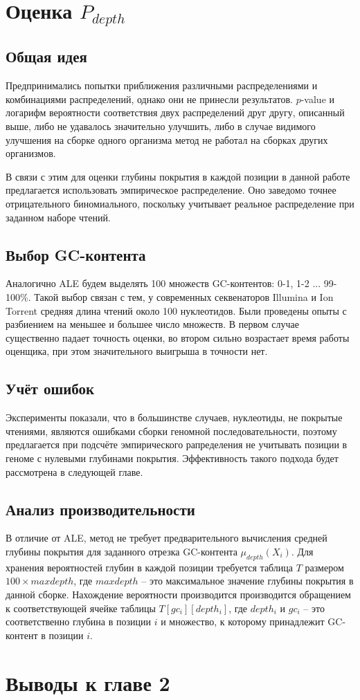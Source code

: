 \section{Оценка $P_{depth}$}
\subsection{Общая идея}
Предпринимались попытки приближения различными распределениями и комбинациями распределений, однако они не принесли результатов. $p$-value и логарифм вероятности соответствия двух распределений друг другу, описанный выше, либо не удавалось значительно улучшить, либо в случае видимого улучшения на сборке  одного организма метод не работал на сборках других организмов.

В связи с этим для оценки глубины покрытия в каждой позиции в данной работе предлагается использовать эмпирическое распределение. Оно заведомо точнее отрицательного биномиального, поскольку учитывает реальное распределение при заданном наборе чтений.

\subsection{Выбор GC-контента}
Аналогично ALE будем выделять 100 множеств GC-контентов: 0-1, 1-2 ... 99-100\%. Такой выбор связан с тем, у современных секвенаторов Illumina и Ion Torrent средняя длина чтений около 100 нуклеотидов. Были проведены опыты с разбиением на меньшее и большее число множеств. В первом случае существенно падает точность оценки, во втором сильно возрастает время работы оценщика, при этом значительного выигрыша в точности нет.

\subsection{Учёт ошибок}
Эксперименты показали, что в большинстве случаев, нуклеотиды, не покрытые чтениями, являются ошибками сборки геномной последовательности, поэтому предлагается при подсчёте эмпирического рапределения не учитывать позиции в геноме с нулевыми глубинами покрытия. Эффективность такого подхода будет рассмотрена в следующей главе.

\subsection{Анализ производительности}
В отличие от ALE, метод не требует предварительного вычисления средней глубины покрытия для заданного отрезка GC-контента $\mu_{depth}(X_i)$. Для хранения вероятностей глубин в каждой позиции требуется таблица $T$ размером $100\times maxdepth$, где $maxdepth$ -- это максимальное значение глубины покрытия в данной сборке. Нахождение вероятности производится производится обращением к соответствующей ячейке таблицы $T[gc_i][depth_i]$, где $depth_i$ и $gc_i$ -- это соответственно глубина в позиции $i$ и множество, к которому принадлежит GC-контент в позиции $i$.

\section{Выводы к главе 2}